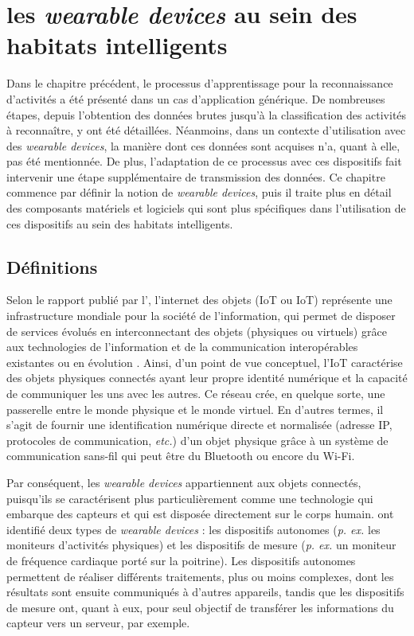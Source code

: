 \chapter{les \textit{wearable devices} au sein des habitats intelligents}
\label{chap:3}

Dans le chapitre précédent, le processus d'apprentissage pour la reconnaissance d'activités a été présenté dans un cas d'application générique. De nombreuses étapes, depuis l'obtention des données brutes jusqu'à la classification des activités à reconnaître, y ont été détaillées. Néanmoins, dans un contexte d'utilisation avec des \textit{wearable devices}, la manière dont ces données sont acquises n'a, quant à elle, pas été mentionnée. De plus, l'adaptation de ce processus avec ces dispositifs fait intervenir une étape supplémentaire de transmission des données. Ce chapitre commence par définir la notion de \textit{wearable devices}, puis il traite plus en détail des composants matériels et logiciels qui sont plus spécifiques dans l'utilisation de ces dispositifs au sein des habitats intelligents.

\section{Définitions}

Selon le rapport publié par l'\cite{InternationalTelecommunicationUnion2012}, l'internet des objets (\acl{IoT} ou \acs{IoT}) représente une \og infrastructure mondiale pour la société de l'information, qui permet de disposer de services évolués en interconnectant des objets (physiques ou virtuels) grâce aux technologies de l'information et de la communication interopérables existantes ou en évolution \fg. Ainsi, d'un point de vue conceptuel, l'\acs{IoT} caractérise des objets physiques connectés ayant leur propre identité numérique et la capacité de communiquer les uns avec les autres. Ce réseau crée, en quelque sorte, une passerelle entre le monde physique et le monde virtuel. En d'autres termes, il s'agit de fournir une identification numérique directe et normalisée (adresse IP, protocoles de communication, \textit{etc.}) d'un objet physique grâce à un système de communication sans-fil qui peut être du Bluetooth ou encore du Wi-Fi.

Par conséquent, les \textit{wearable devices} appartiennent aux objets connectés, puisqu'ils se caractérisent plus particulièrement comme une technologie qui embarque des capteurs et qui est disposée directement sur le corps humain. \cite{Godfrey2018} ont identifié deux types de \textit{wearable devices} : les dispositifs autonomes (\textit{p. ex.} les moniteurs d'activités physiques) et les dispositifs de mesure (\textit{p. ex.} un moniteur de fréquence cardiaque porté sur la poitrine). Les dispositifs autonomes permettent de réaliser différents traitements, plus ou moins complexes, dont les résultats sont ensuite communiqués à d'autres appareils, tandis que les dispositifs de mesure ont, quant à eux, pour seul objectif de transférer les informations du capteur vers un serveur, par exemple.

